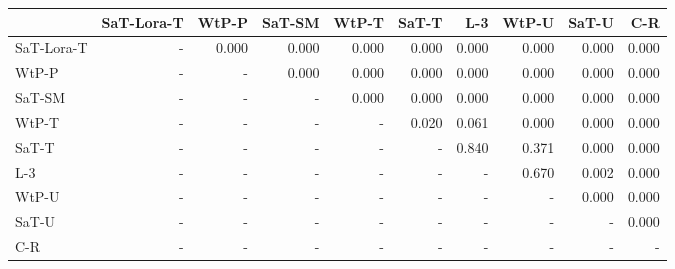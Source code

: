 \begin{tabular}{lrrrrrrrrr}
\toprule
 & SaT-Lora-T & WtP-P & SaT-SM & WtP-T & SaT-T & L-3 & WtP-U & SaT-U & C-R \\
\midrule
SaT-Lora-T & - & 0.000 & 0.000 & 0.000 & 0.000 & 0.000 & 0.000 & 0.000 & 0.000 \\
WtP-P & - & - & 0.000 & 0.000 & 0.000 & 0.000 & 0.000 & 0.000 & 0.000 \\
SaT-SM & - & - & - & 0.000 & 0.000 & 0.000 & 0.000 & 0.000 & 0.000 \\
WtP-T & - & - & - & - & 0.020 & 0.061 & 0.000 & 0.000 & 0.000 \\
SaT-T & - & - & - & - & - & 0.840 & 0.371 & 0.000 & 0.000 \\
L-3 & - & - & - & - & - & - & 0.670 & 0.002 & 0.000 \\
WtP-U & - & - & - & - & - & - & - & 0.000 & 0.000 \\
SaT-U & - & - & - & - & - & - & - & - & 0.000 \\
C-R & - & - & - & - & - & - & - & - & - \\
\bottomrule
\end{tabular}

